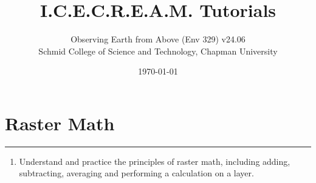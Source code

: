 \documentclass[oneside,a4paper,11pt,explicit]{book}
\title{I.C.E.C.R.E.A.M. Tutorials}
\subtitle{\small Observing Earth from Above (Env 329) v24.06 \\
	\small Schmid College of Science and Technology, Chapman University}
\date{\today}
\begin{document}
\setcounter{tocdepth}{3}
\setcounter{minitocdepth}{3}
\dominitoc

\faketableofcontents

\setcounter{chapter}{10} %

\chapter{Raster Math} %

\vspace{-2em}

\minitoc

\hrule

\vspace{1em}

\begin{tcolorbox}[enhanced,frame style image=blueshade.png,
	opacityback=0.75,opacitybacktitle=0.25,
	colback=blue!5!white,colframe=blue!75!black,title={\Large \textbf{Objectives:}}]
	\large
	\begin{enumerate}
		\item Understand and practice the principles of raster math, including adding, subtracting, averaging and performing a calculation on a layer. 

	\end{enumerate}
\end{tcolorbox}

\clearpage
\end{document}
